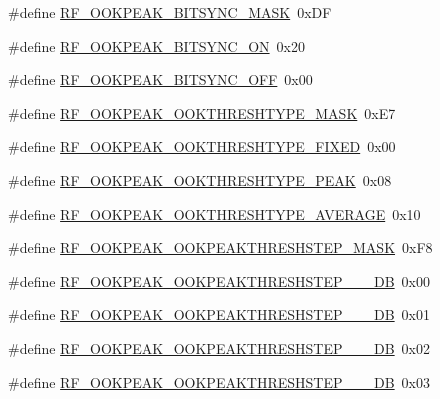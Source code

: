 \begin{DoxyCompactItemize}
\item 
\#define \mbox{\hyperlink{sx1276_regs-_fsk_8h_a07bd216fd11bb1522ddaaec499b1acc6}{R\+F\+\_\+\+O\+O\+K\+P\+E\+A\+K\+\_\+\+B\+I\+T\+S\+Y\+N\+C\+\_\+\+M\+A\+SK}}~0x\+DF
\item 
\#define \mbox{\hyperlink{sx1276_regs-_fsk_8h_a3069cb1326f97de4513e38c42efcf442}{R\+F\+\_\+\+O\+O\+K\+P\+E\+A\+K\+\_\+\+B\+I\+T\+S\+Y\+N\+C\+\_\+\+ON}}~0x20
\item 
\#define \mbox{\hyperlink{sx1276_regs-_fsk_8h_a46e977e1bee2a0285de1c083959c7bbf}{R\+F\+\_\+\+O\+O\+K\+P\+E\+A\+K\+\_\+\+B\+I\+T\+S\+Y\+N\+C\+\_\+\+O\+FF}}~0x00
\item 
\#define \mbox{\hyperlink{sx1276_regs-_fsk_8h_ae957050c27e9149fe25fae7276d721ec}{R\+F\+\_\+\+O\+O\+K\+P\+E\+A\+K\+\_\+\+O\+O\+K\+T\+H\+R\+E\+S\+H\+T\+Y\+P\+E\+\_\+\+M\+A\+SK}}~0x\+E7
\item 
\#define \mbox{\hyperlink{sx1276_regs-_fsk_8h_a9d2ecb9366c343ab004e496ac9ceb599}{R\+F\+\_\+\+O\+O\+K\+P\+E\+A\+K\+\_\+\+O\+O\+K\+T\+H\+R\+E\+S\+H\+T\+Y\+P\+E\+\_\+\+F\+I\+X\+ED}}~0x00
\item 
\#define \mbox{\hyperlink{sx1276_regs-_fsk_8h_a20ec7775c45b4a1cc90fe08e498d5bf9}{R\+F\+\_\+\+O\+O\+K\+P\+E\+A\+K\+\_\+\+O\+O\+K\+T\+H\+R\+E\+S\+H\+T\+Y\+P\+E\+\_\+\+P\+E\+AK}}~0x08
\item 
\#define \mbox{\hyperlink{sx1276_regs-_fsk_8h_a5ff6a1e29aba2e560b9ecedad7e31edd}{R\+F\+\_\+\+O\+O\+K\+P\+E\+A\+K\+\_\+\+O\+O\+K\+T\+H\+R\+E\+S\+H\+T\+Y\+P\+E\+\_\+\+A\+V\+E\+R\+A\+GE}}~0x10
\item 
\#define \mbox{\hyperlink{sx1276_regs-_fsk_8h_a524369fe14789f919e9d15908c500e08}{R\+F\+\_\+\+O\+O\+K\+P\+E\+A\+K\+\_\+\+O\+O\+K\+P\+E\+A\+K\+T\+H\+R\+E\+S\+H\+S\+T\+E\+P\+\_\+\+M\+A\+SK}}~0x\+F8
\item 
\#define \mbox{\hyperlink{sx1276_regs-_fsk_8h_aeb7f9969c7c16737c6d44fc3c9e50dfa}{R\+F\+\_\+\+O\+O\+K\+P\+E\+A\+K\+\_\+\+O\+O\+K\+P\+E\+A\+K\+T\+H\+R\+E\+S\+H\+S\+T\+E\+P\+\_\+\_\+\_\+\+DB}}~0x00
\item 
\#define \mbox{\hyperlink{sx1276_regs-_fsk_8h_a502a4cebfd6bf36312360df00b987d5e}{R\+F\+\_\+\+O\+O\+K\+P\+E\+A\+K\+\_\+\+O\+O\+K\+P\+E\+A\+K\+T\+H\+R\+E\+S\+H\+S\+T\+E\+P\+\_\+\_\+\_\+\+DB}}~0x01
\item 
\#define \mbox{\hyperlink{sx1276_regs-_fsk_8h_a3c73c078a2b02c4d7c96a7645cd59dc5}{R\+F\+\_\+\+O\+O\+K\+P\+E\+A\+K\+\_\+\+O\+O\+K\+P\+E\+A\+K\+T\+H\+R\+E\+S\+H\+S\+T\+E\+P\+\_\+\_\+\_\+\+DB}}~0x02
\item 
\#define \mbox{\hyperlink{sx1276_regs-_fsk_8h_ac659aab479d8f4719a2e5e04bed3b9bf}{R\+F\+\_\+\+O\+O\+K\+P\+E\+A\+K\+\_\+\+O\+O\+K\+P\+E\+A\+K\+T\+H\+R\+E\+S\+H\+S\+T\+E\+P\+\_\+\_\+\_\+\+DB}}~0x03

\end{DoxyCompactItemize}
